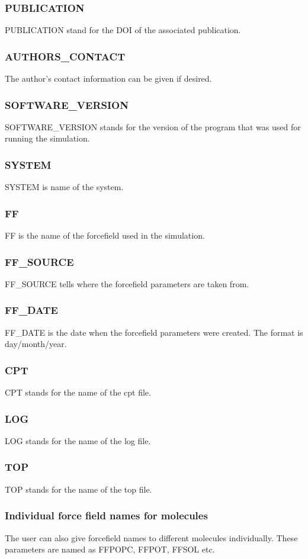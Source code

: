 \documentclass[fleqn,10pt]{wlscirep}
\begin{document}
\subsubsection*{PUBLICATION}
PUBLICATION stand for the DOI of the associated publication.

\subsubsection*{AUTHORS\_CONTACT}
The author's contact information can be given if desired.

\subsubsection*{SOFTWARE\_VERSION}
SOFTWARE\_VERSION stands for the version of the program that was used for running the simulation.

\subsubsection*{SYSTEM}
SYSTEM is name of the system.
\subsubsection*{FF}
FF is the name of the forcefield used in the simulation.
\subsubsection*{FF\_SOURCE}
FF\_SOURCE tells where the forcefield parameters are taken from.
\subsubsection*{FF\_DATE}
FF\_DATE is the date when the forcefield parameters were created. The format is day/month/year.
\subsubsection*{CPT}
CPT stands for the name of the cpt file. 
\subsubsection*{LOG}
LOG stands for the name of the log file.
\subsubsection*{TOP}
TOP stands for the name of the top file.
\subsubsection*{Individual force field names for molecules}
The user can also give forcefield names to different molecules individually. These parameters are named as FFPOPC, FFPOT, FFSOL etc.
\end{document}
